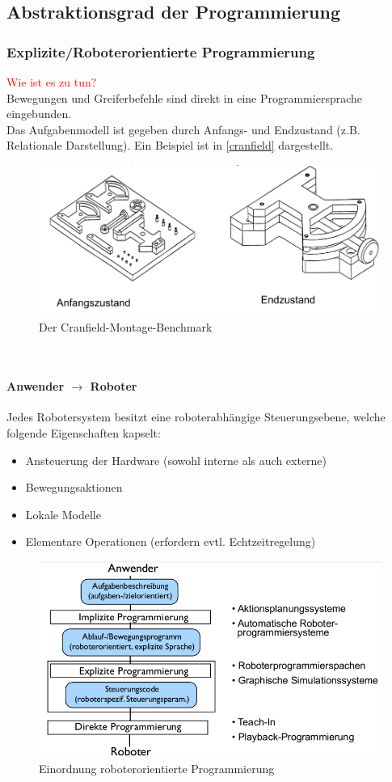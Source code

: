 \subsection{Abstraktionsgrad der Programmierung}
\subsubsection{Explizite/Roboterorientierte Programmierung}
\textcolor{red}{\glqq Wie ist es zu tun?\grqq} \\
Bewegungen und Greiferbefehle sind direkt in eine Programmiersprache eingebunden.\\
Das Aufgabenmodell ist gegeben durch Anfangs- und Endzustand (z.B. Relationale Darstellung). Ein Beispiel ist in \autoref{cranfield} dargestellt.\\
\begin{figure}[h!]\centering 
\includegraphics[width=0.7\linewidth]{figures/ch01_cranfield.png}
\caption{Der Cranfield-Montage-Benchmark}
\label{cranfield}
\end{figure}\\
\paragraph{Anwender $\rightarrow$ Roboter}
Jedes Robotersystem besitzt eine roboterabhängige Steuerungsebene, welche folgende Eigenschaften kapselt:
\begin{itemize}
\item Ansteuerung der Hardware (sowohl interne als auch externe)
\item Bewegungsaktionen
\item Lokale Modelle
\item Elementare Operationen (erfordern evtl. Echtzeitregelung)
\end{itemize}
\begin{figure}[h!]\centering 
\includegraphics[width=0.7\linewidth]{figures/ch01_einordnung.png}
\caption{Einordnung roboterorientierte Programmierung}
\label{einord}
\end{figure}
